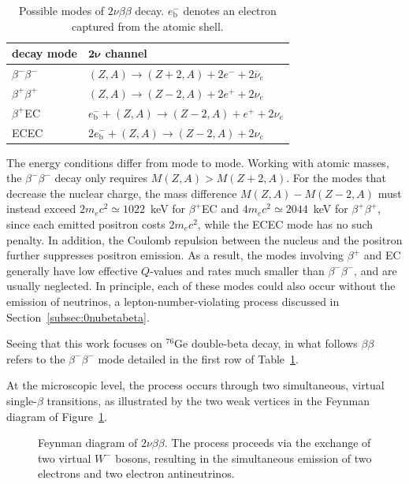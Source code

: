 \begin{table}[H]
    \centering
    \begin{tabular}{ll}
        \toprule
        \textbf{decay mode} & $\boldsymbol{2\nu}$ \textbf{channel} \\
        \midrule
        $\beta^-\beta^-$ & $(Z,A) \to (Z+2,A) + 2e^- + 2\overline{\nu}_e$ \\
        $\beta^+\beta^+$ & $(Z,A) \to (Z-2,A) + 2e^+ + 2\nu_e$ \\
        $\beta^+$\ac{EC} & $e^-_\text{b} + (Z,A) \to (Z-2,A) + e^+ + 2\nu_e$ \\
        \ac{EC}\ac{EC} & $2e^-_\text{b} + (Z,A) \to (Z-2,A) + 2\nu_e$ \\
        \bottomrule
    \end{tabular}
    \caption{Possible modes of $2\nu\beta\beta$ decay. $e^-_\text{b}$ denotes an electron captured from the atomic shell.}
    \label{tab:bb-modes}
\end{table}

The energy conditions differ from mode to mode. Working with atomic masses, the $\beta^-\beta^-$ decay only requires $M(Z,A) > M(Z+2,A)$. For the modes that decrease the nuclear charge, the mass difference $M(Z,A) - M(Z-2,A)$ must instead exceed $2m_ec^2 \simeq 1022$~keV for $\beta^+$\ac{EC} and $4m_ec^2 \simeq 2044$~keV for $\beta^+\beta^+$, since each emitted positron costs $2m_ec^2$, while the \ac{EC}\ac{EC} mode has no such penalty. In addition, the Coulomb repulsion between the nucleus and the positron further suppresses positron emission. As a result, the modes involving $\beta^+$ and \ac{EC} generally have low effective $Q$-values and rates much smaller than $\beta^-\beta^-$, and are usually neglected. In principle, each of these modes could also occur without the emission of neutrinos, a lepton-number-violating process discussed in Section~\ref{subsec:0nubetabeta}. 

Seeing that this work focuses on ${}^{76}$Ge double-beta decay, in what follows $\beta\beta$ refers to the $\beta^-\beta^-$ mode detailed in the first row of Table~\ref{tab:bb-modes}.

At the microscopic level, the process occurs through two simultaneous, virtual single-$\beta$ transitions, as illustrated by the two weak vertices in the Feynman diagram of Figure~\ref{fig:2nu_feynman}.

\begin{figure}[H]
    \centering
    
    \caption{Feynman diagram of $2\nu\beta\beta$. The process proceeds via the exchange of two virtual $W^-$ bosons, resulting in the simultaneous emission of two electrons and two electron antineutrinos.}
    \label{fig:2nu_feynman}
\end{figure}

